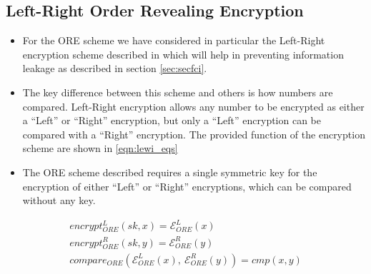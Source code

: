 \documentclass[letterpaper, 10 pt, conference]{ieeeconf}  %
\begin{document}
\subsection{Left-Right Order Revealing Encryption}
\begin{itemize}
   \item For the ORE scheme we have considered in particular the Left-Right encryption scheme described in \cite{lewiOrderRevealingEncryptionNew2016} which will help in preventing information leakage as described in section \ref{sec:secfci}.
   \item The key difference between this scheme and others is how numbers are compared. Left-Right encryption allows any number to be encrypted as either a ``Left'' or ``Right'' encryption, but only a ``Left'' encryption can be compared with a ``Right'' encryption. The provided function of the encryption scheme are shown in \eqref{eqn:lewi_eqs}
   \item The ORE scheme described requires a single symmetric key for the encryption of either ``Left'' or ``Right'' encryptions, which can be compared without any key.
\end{itemize}
\begin{equation}
   \begin{gathered} \label{eqn:lewi_eqs}
      encrypt^L_{ORE}(sk, x) = \mathcal{E}^L_{ORE}(x) \\
      encrypt^R_{ORE}(sk, y) = \mathcal{E}^R_{ORE}(y) \\
      compare_{ORE}(\mathcal{E}^L_{ORE}(x),\ \mathcal{E}^R_{ORE}(y)) = cmp(x, y)
   \end{gathered}
\end{equation}


\end{document}
